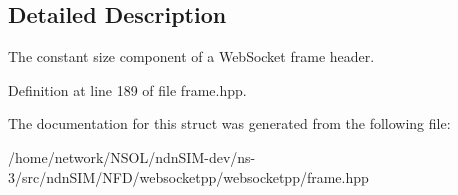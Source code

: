 \subsection{Detailed Description}
The constant size component of a Web\+Socket frame header. 

Definition at line 189 of file frame.\+hpp.



The documentation for this struct was generated from the following file\+:\begin{DoxyCompactItemize}
\item 
/home/network/\+N\+S\+O\+L/ndn\+S\+I\+M-\/dev/ns-\/3/src/ndn\+S\+I\+M/\+N\+F\+D/websocketpp/websocketpp/frame.\+hpp\end{DoxyCompactItemize}
